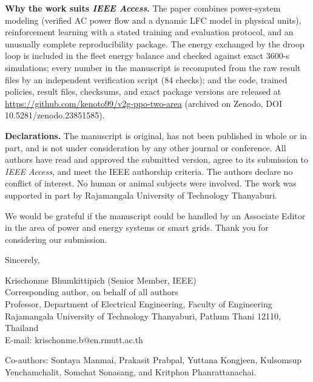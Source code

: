 \documentclass[11pt,a4paper]{article}
\begin{document}
\textbf{Why the work suits \emph{IEEE Access}.} The paper combines
power-system modeling (verified AC power flow and a dynamic LFC model
in physical units), reinforcement learning with a stated training and
evaluation protocol, and an unusually complete reproducibility package.
The energy exchanged by the droop loop is included in the fleet energy
balance and checked against exact 3600-s simulations; every number in
the manuscript is recomputed from the raw result files by an
independent verification script (84 checks); and the code, trained
policies, result files, checksums, and exact package versions are
released at \url{https://github.com/kenoto99/v2g-ppo-two-area}
(archived on Zenodo, DOI 10.5281/zenodo.23851585).

\textbf{Declarations.} The manuscript is original, has not been
published in whole or in part, and is not under consideration by any
other journal or conference. All authors have read and approved the
submitted version, agree to its submission to \emph{IEEE Access}, and
meet the IEEE authorship criteria. The authors declare no conflict of
interest. No human or animal subjects were involved. The work was
supported in part by Rajamangala University of Technology Thanyaburi.

We would be grateful if the manuscript could be handled by an Associate
Editor in the area of power and energy systems or smart grids. Thank you
for considering our submission.

\vspace{10pt}
Sincerely,

\vspace{18pt}
\noindent
Krischonme Bhumkittipich (Senior Member, IEEE)\\
Corresponding author, on behalf of all authors\\
Professor, Department of Electrical Engineering, Faculty of Engineering\\
Rajamangala University of Technology Thanyaburi, Pathum Thani 12110, Thailand\\
E-mail: krischonme.b@en.rmutt.ac.th

\vspace{8pt}
\noindent\small
Co-authors: Sontaya Manmai, Prakasit Prabpal, Yuttana Kongjeen, Kulsomsup Yenchamchalit, Somchat Sonasang, and Kritphon Phanrattanachai.
\end{document}
